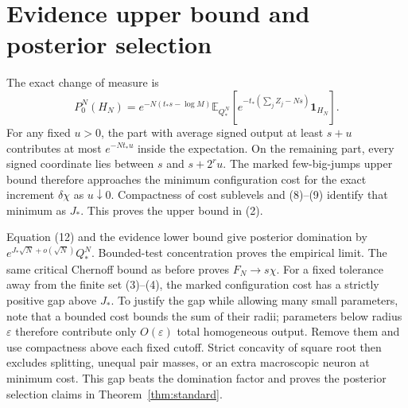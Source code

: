 \documentclass[11pt]{article}
\newcommand{\E}{\mathbb E}\newcommand{\R}{\mathbb R}\newcommand{\Pp}{\mathbb P}
\newcommand{\one}{\mathbf1}\newcommand{\relu}{\operatorname{ReLU}}
\begin{document}
\section{Evidence upper bound and posterior selection}
The exact change of measure is
\[
 P_0^N(H_N)=e^{-N(t_*s-\log M)}
 \E_{Q_*^N}\left[e^{-t_*(\sum_jZ_j-Ns)}\one_{H_N}\right].   \tag{12}
\]
For any fixed $u>0$, the part with average signed output at least
$s+u$ contributes at most $e^{-Nt_*u}$ inside the expectation.
On the remaining part, every signed coordinate lies between $s$ and
$s+2^ru$. The marked few-big-jumps upper bound therefore approaches
the minimum configuration cost for the exact increment $\delta\chi$
as $u\downarrow0$. Compactness of cost sublevels and (8)--(9) identify
that minimum as $J_*$. This proves the upper bound in (2).

Equation (12) and the evidence lower bound give posterior domination
by $e^{J_*\sqrt N+o(\sqrt N)}Q_*^N$. Bounded-test concentration proves
the empirical limit. The same critical Chernoff bound as before proves
$F_N\to s\chi$. For a fixed tolerance away from the finite set (3)--(4),
the marked configuration cost has a strictly positive gap above $J_*$.
To justify the gap while allowing many small parameters, note that
a bounded cost bounds the sum of their radii; parameters below radius
$\varepsilon$ therefore contribute only $O(\varepsilon)$ total
homogeneous output. Remove them and use compactness above each fixed
cutoff. Strict concavity of square root then excludes splitting,
unequal pair masses, or an extra macroscopic neuron at minimum cost.
This gap beats the domination factor and proves the posterior selection
claims in Theorem~\ref{thm:standard}.
\end{document}
